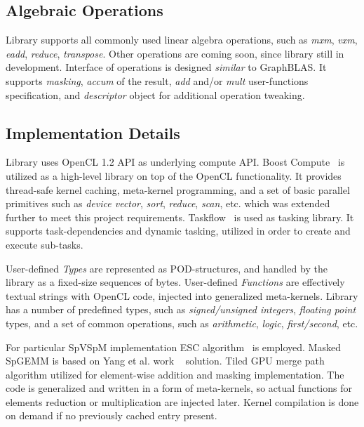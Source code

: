\subsection{Algebraic Operations}

Library supports all commonly used linear algebra operations, such as \textit{mxm}, \textit{vxm}, \textit{eadd}, \textit{reduce}, \textit{transpose}. 
Other operations are coming soon, since library still in development.
Interface of operations is designed \textit{similar} to GraphBLAS. 
It supports \textit{masking}, \textit{accum} of the result, \textit{add} and/or \textit{mult} user-functions specification, and \textit{descriptor} object for additional operation tweaking.

\subsection{Implementation Details}

Library uses OpenCL 1.2 API as underlying compute API. 
Boost Compute~\cite{10.1145/2909437.2909454:boost:compute} is utilized as a high-level library on top of the OpenCL functionality. 
It provides thread-safe kernel caching, meta-kernel programming, and a set of basic parallel primitives such as \textit{device vector}, \textit{sort}, \textit{reduce}, \textit{scan}, etc. which was extended further to meet this project requirements.
Taskflow~\cite{Huang2022TaskflowAL} is used as tasking library. It supports task-dependencies and dynamic tasking, utilized in order to create and execute sub-tasks. 

User-defined \textit{Types} are represented as POD-structures, and handled by the library as a fixed-size sequences of bytes.
User-defined \textit{Functions} are effectively textual strings with OpenCL code, injected into generalized meta-kernels.
Library has a number of predefined types, such as \textit{signed/unsigned integers}, \textit{floating point} types, and a set of common operations, such as \textit{arithmetic}, \textit{logic}, \textit{first/second}, etc.

For particular SpVSpM implementation ESC algorithm~\cite{10.1145/2699470:esc:algo} is employed. 
Masked SpGEMM is based on Yang et al. work ~\cite{yang2019graphblast} solution. 
Tiled GPU merge path~\cite{inproceedings:gpu_merge_path} algorithm utilized for element-wise addition and masking implementation.
The code is generalized and written in a form of meta-kernels, so actual functions for elements reduction or multiplication are injected later.
Kernel compilation is done on demand if no previously cached entry present.